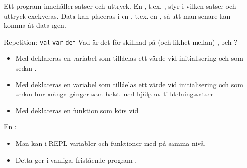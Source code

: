 

\ifkompendium

\noindent Ett program innehåller satser och uttryck. En , t.ex. , styr i vilken  satser och uttryck exekveras. Data kan placeras i en , t.ex. en , så att man senare kan komma åt data igen.    
\fi


\ifkompendium\else
\begin{SlideExtra}{Repetition: \texttt{val} \texttt{var} \texttt{def}}
  Vad är det för skillnad på (och likhet mellan) ,  och ? \pause
  \begin{itemize}
    \item Med  deklareras en variabel som tilldelas ett värde vid initialisering och som sedan .
    \item Med  deklareras en variabel som tilldelas ett värde vid initialisering och som sedan  hur många gånger som helst med hjälp av tilldelningssatser.
    \item Med  deklareras en funktion som körs vid 
  \end{itemize}
  \pause\vspace{1em} En : 
  \begin{itemize}
  \item Man kan i REPL  variabler och funktioner med   på samma nivå. 
  \item Detta ger i vanliga, fristående program . 
  \end{itemize}
\end{SlideExtra}
\fi 



